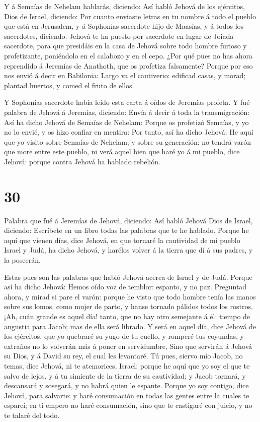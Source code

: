  Y á Semaías de Nehelam hablarás, diciendo: 
Así habló Jehová de los ejércitos, Dios de Israel, diciendo: Por cuanto
enviaste letras en tu nombre á todo el pueblo que está en Jerusalem, y á
Sophonías sacerdote hijo de Maasías, y á todos los sacerdotes, diciendo:
 Jehová te ha puesto por sacerdote en lugar de Joiada
sacerdote, para que presidáis en la casa de Jehová sobre todo hombre
furioso y profetizante, poniéndolo en el calabozo y en el cepo.
 ¿Por qué pues no has ahora reprendido á Jeremías de
Anathoth, que os profetiza falsamente?  Porque por eso nos
envió á decir en Babilonia: Largo va el cautiverio: edificad casas, y
morad; plantad huertos, y comed el fruto de ellos.

 Y Sophonías sacerdote había leído esta carta á oídos de
Jeremías profeta.  Y fué palabra de Jehová á Jeremías,
diciendo:  Envía á decir á toda la transmigración: Así ha
dicho Jehová de Semaías de Nehelam: Porque os profetizó Semaías, y yo no
lo envié, y os hizo confiar en mentira:  Por tanto, así ha
dicho Jehová: He aquí que yo visito sobre Semaías de Nehelam, y sobre su
generación: no tendrá varón que more entre este pueblo, ni verá aquel
bien que haré yo á mi pueblo, dice Jehová: porque contra Jehová ha
hablado rebelión.

\hypertarget{section-29}{%
\section{30}\label{section-29}}

 Palabra que fué á Jeremías de Jehová, diciendo:
 Así habló Jehová Dios de Israel, diciendo: Escríbete en un
libro todas las palabras que te he hablado.  Porque he aquí
que vienen días, dice Jehová, en que tornaré la cautividad de mi pueblo
Israel y Judá, ha dicho Jehová, y harélos volver á la tierra que dí á
sus padres, y la poseerán.

 Estas pues son las palabras que habló Jehová acerca de
Israel y de Judá.  Porque así ha dicho Jehová: Hemos oído
voz de temblor: espanto, y no paz.  Preguntad ahora, y mirad
si pare el varón: porque he visto que todo hombre tenía las manos sobre
sus lomos, como mujer de parto, y hanse tornado pálidos todos los
rostros.  ¡Ah, cuán grande es aquel día! tanto, que no hay
otro semejante á él: tiempo de angustia para Jacob; mas de ella será
librado.  Y será en aquel día, dice Jehová de los ejércitos,
que yo quebraré su yugo de tu cuello, y romperé tus coyundas, y extraños
no lo volverán más á poner en servidumbre,  Sino que
servirán á Jehová su Dios, y á David su rey, el cual les levantaré.
 Tú pues, siervo mío Jacob, no temas, dice Jehová, ni te
atemorices, Israel: porque he aquí que yo soy el que te salvo de lejos,
y á tu simiente de la tierra de su cautividad; y Jacob tornará, y
descansará y sosegará, y no habrá quien le espante.  Porque
yo soy contigo, dice Jehová, para salvarte: y haré consumación en todas
las gentes entre la cuales te esparcí; en ti empero no haré consumación,
sino que te castigaré con juicio, y no te talaré del todo.

